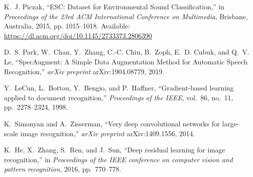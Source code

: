 \documentclass[conference]{IEEEtran}
\begin{document}
\begin{thebibliography}{00}

K.~J. Piczak, ``ESC: Dataset for Environmental Sound Classification,''
in \emph{Proceedings of the 23rd ACM International Conference on Multimedia},
Brisbane, Australia, 2015, pp. 1015--1018. Available: \url{https://dl.acm.org/doi/10.1145/2733373.2806390}

D.~S. Park, W.~Chan, Y.~Zhang, C.-C. Chiu, B.~Zoph, E.~D. Cubuk, and Q.~V. Le,
``SpecAugment: A Simple Data Augmentation Method for Automatic Speech Recognition,''
\emph{arXiv preprint} arXiv:1904.08779, 2019.

Y.~LeCun, L.~Bottou, Y.~Bengio, and P.~Haffner,
``Gradient-based learning applied to document recognition,''
\emph{Proceedings of the IEEE}, vol.~86, no.~11, pp.~2278--2324, 1998.

K.~Simonyan and A.~Zisserman,
``Very deep convolutional networks for large-scale image recognition,''
\emph{arXiv preprint} arXiv:1409.1556, 2014.

K.~He, X.~Zhang, S.~Ren, and J.~Sun,
``Deep residual learning for image recognition,''
in \emph{Proceedings of the IEEE conference on computer vision and pattern recognition}, 2016, pp.~770--778.

\end{thebibliography}
\end{document}
